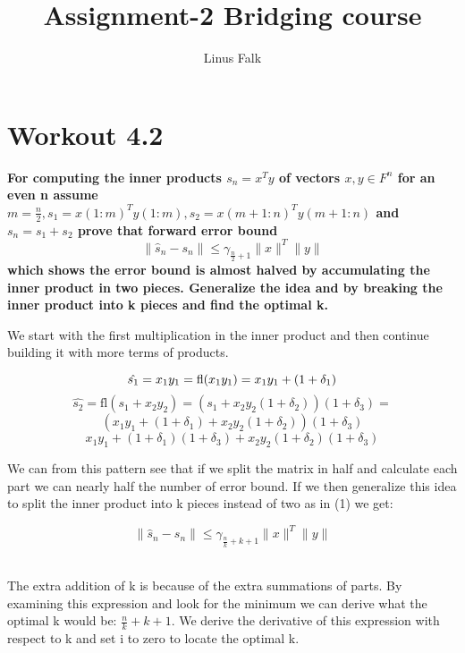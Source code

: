\documentclass[a4paper]{article}
\title{Assignment-2 Bridging course}
\author{Linus Falk}
\begin{document}
\maketitle{}

\section{Workout 4.2}
\textbf{For computing the inner products $s_n = x^{T}y$ of vectors $x,y \in F^{n}$ for an even n assume $m = \frac{n}{2}, s_1=x(1:m)^{T}y(1:m), s_2=x(m+1:n)^{T}y(m+1:n)$ and $s_n=s_1+s_2$ prove that forward error bound}
\begin{equation}
	\| \hat{s}_n - s_n \| \le \gamma_{\frac{n}{2}+1} \|x\|^{T}\|y\|
\end{equation}
\textbf{which shows the error bound is almost halved by accumulating the inner product in two pieces. Generalize the idea and by breaking the inner product into k pieces and find the optimal k.}

We start with the first multiplication in the inner product and then continue building it with more terms of products.

\begin{equation}
	\hat{s_1} =x_1y_1 = \text{fl}(x_1y_1) = x_1y_1+(1+\delta_1) \\
\end{equation}
\begin{equation}
	\hat{s_2} = \text{fl}(s_1+x_2y_2) = (s_1+x_2y_2(1+\delta_2))(1+\delta_3) = 
\nonumber
\end{equation}
\begin{equation}
	(x_1y_1+(1+\delta_1)+x_2y_2(1+\delta_2))(1+\delta_3)
\nonumber
\end{equation}
\begin{equation}
	x_1y_1+(1+\delta_1)(1+\delta_3) +x_2y_2(1+\delta_2)(1+\delta_3)
\end{equation}

We can from this pattern see that if we split the matrix in half and calculate each part we can nearly half the number of error bound.
If we then generalize this idea to  split the inner product into k pieces instead of two as in (1) we get:

\begin{equation}
	\| \hat{s}_n - s_n \| \le \gamma_{\frac{n}{k}+k+1} \|x\|^{T}\|y\|
\end{equation}\

The extra addition of k is because of the extra summations of parts. By examining this expression and look for the minimum we can derive what the optimal k would be: $\frac{n}{k} + k + 1$. We derive the derivative of this expression with respect to k and set i to zero to locate the optimal k. 
\end{document}
